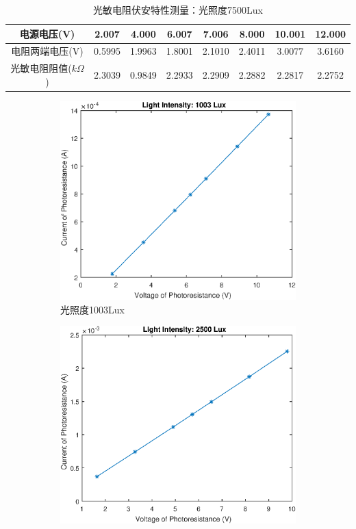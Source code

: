 \documentclass{ctexart}
\begin{document}
\begin{table}[H]
  \centering
  \begin{tabular}{|c|c|c|c|c|c|c|c|}
    \hline
    电源电压(V) &2.007&4.000&6.007&7.006&8.000&10.001&12.000\\\hline
    电阻两端电压(V) &0.5995&1.9963&1.8001&2.1010&2.4011&3.0077&3.6160\\\hline
    光敏电阻阻值($k\Omega$)&2.3039&0.9849&2.2933&2.2909&2.2882&2.2817&2.2752 \\\hline
  \end{tabular}
  \caption{光敏电阻伏安特性测量：光照度7500Lux}
\end{table}

\begin{figure}[H]
  \centering
  \begin{subfigure}{.45\textwidth}
    \centering
    \includegraphics[width=\linewidth]{光电传感器综合实验图像/photoresistor_1003Lux}
    \caption{光照度1003Lux}
  \end{subfigure}
  \begin{subfigure}{.45\textwidth}
    \centering
    \includegraphics[width=\linewidth]{光电传感器综合实验图像/photoresistor_2500Lux}

\end{subfigure}
\end{figure}
\end{document}
